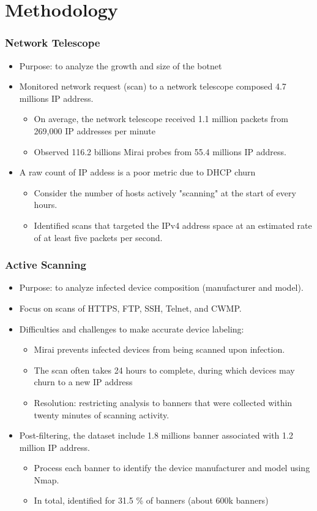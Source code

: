 \documentclass{beamer}
\begin{document}
\section{Methodology}

\begin{frame}
	\frametitle{Network Telescope}
	\begin{itemize}
		\item Purpose: to analyze the growth and size of the botnet
		\item Monitored network request (scan) to a network telescope composed 4.7 millions IP address.
		\begin{itemize}
			\item On average, the network telescope received 1.1 million packets from 269,000 IP addresses per minute 
			\item Observed 116.2 billions Mirai probes from 55.4 millions IP address.
		\end{itemize}
		\item A raw count of IP addess is a poor metric due to DHCP churn
		\begin{itemize}
			\item Consider the number of hosts actively "scanning" at the start of every hours.
			\item Identified scans that targeted the IPv4 address space at an estimated rate of at least five packets per second.
		\end{itemize}
	\end{itemize}
\end{frame}

\begin{frame}
	\frametitle{Active Scanning}
	\begin{itemize}
		\item Purpose: to analyze infected device composition (manufacturer and model).
		\item Focus on scans of HTTPS, FTP, SSH, Telnet, and CWMP.
		\item Difficulties and challenges to make accurate device labeling:		
		\begin{itemize}
			\item Mirai prevents infected devices from being scanned upon infection.
			\item The scan often takes 24 hours to complete, during which devices may churn to a new IP address
			\item Resolution: restricting analysis to banners that were collected within twenty minutes of scanning activity.
		\end{itemize}
		\item Post-filtering, the dataset include 1.8 millions banner associated with 1.2 million IP address.
		\begin{itemize}
			\item Process each banner to identify the device manufacturer and model using Nmap.
			\item In total, identified for 31.5 \% of banners (about 600k banners)
		\end{itemize}
	\end{itemize}
\end{frame}
\end{document}
